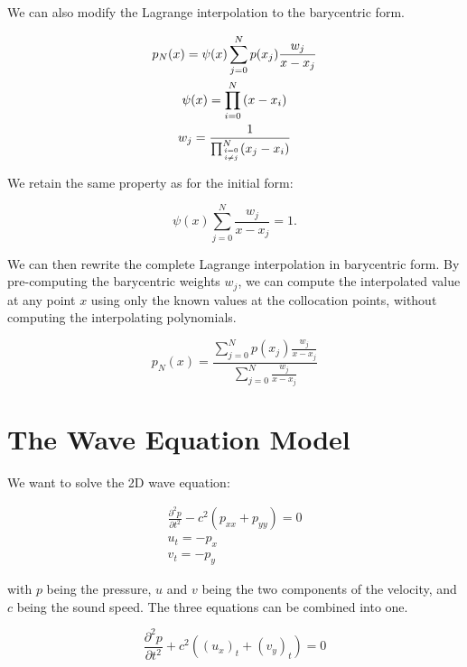 We can also modify the Lagrange interpolation to the barycentric form.

\begin{gather}
    p_N(x) = \psi(x)\sum_{j = 0}^{N}p(x_j)\frac{w_j}{x - x_j} \\
    \psi(x) = \prod_{i = 0}^{N}\left ( x - x_i \right ) \\
    w_j = \frac{1}{\prod_{\genfrac{}{}{0pt}{2}{i = 0}{i \neq j}}^{N}(x_j - x_i)}
\end{gather}

\noindent
We retain the same property as for the initial form:

\begin{equation}
    \psi(x)\sum_{j = 0}^{N}\frac{w_j}{x - x_j} = 1.
\end{equation}

We can then rewrite the complete Lagrange interpolation in barycentric form. By pre-computing the
barycentric weights \(w_j\), we can compute the interpolated value at any point \(x\) using only the
known values at the collocation points, without computing the interpolating polynomials. 

\begin{equation}
    p_N(x) = \frac{\sum_{j = 0}^{N} p(x_j)\frac{w_j}{x - x_j}}{\sum_{j = 0}^{N}\frac{w_j}{x - x_j}}
\end{equation}

\section{The Wave Equation Model}\label{section:spectral_element_method:equation}

We want to solve the 2D wave equation:

\begin{gather}
    \frac{\partial^2p}{\partial t^2} - c^2(p_{xx} + p_{yy}) = 0 \\
    u_t = - p_x \\
    v_t = -p_y
\end{gather}

\noindent
with \(p\) being the pressure, \(u\) and \(v\) being the two components of the velocity, and \(c\)
being the sound speed. The three equations can be combined into one.

\begin{equation} \label{equ:2d_wave}
    \frac{\partial^2p}{\partial t^2} + c^2 \left( {\left( u_x \right)}_t + {\left( v_y \right)}_t \right) = 0
\end{equation}

